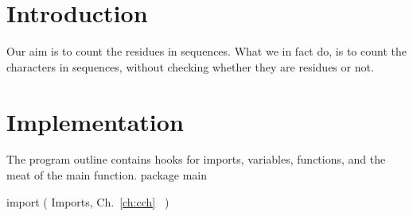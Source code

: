 \nwfilename{}\nwenddocs{}\nwdocspar%
\section*{Introduction}
Our aim is to count the residues in sequences. What we in fact do, is
to count the characters in sequences, without checking whether they
are residues or not.
\section*{Implementation}
The program outline contains hooks for imports, variables, functions,
and the meat of the main function.
\nwenddocs{}\endmoddef\nwstartdeflinemarkup\nwenddeflinemarkup
package main

import (
          \LA{}Imports, Ch.~\ref{ch:cch}~{\nwtagstyle{}}\RA{}
)


